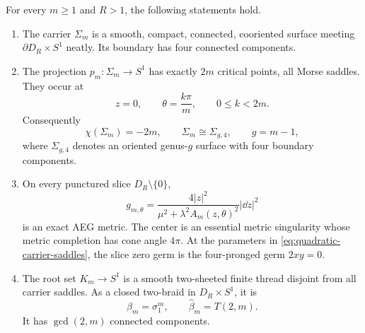 \begin{theorem}
\label{thm:quadratic-threaded-carriers}
For every $m\ge1$ and $R>1$, the following statements hold.
\begin{enumerate}
\item The carrier $\Sigma_m$ is a smooth, compact, connected, cooriented surface
  meeting $\partial D_R\times S^1$ neatly.  Its boundary has four connected
  components.
\item The projection $p_m:\Sigma_m\to S^1$ has exactly $2m$ critical points,
  all Morse saddles.  They occur at
  \begin{equation}
   z=0,
   \qquad
   \theta=\frac{k\pi}{m},
   \qquad 0\le k<2m.
   \label{eq:quadratic-carrier-saddles}
  \end{equation}
  Consequently
  \begin{equation}
   \chi(\Sigma_m)=-2m,
   \qquad
   \Sigma_m\cong\Sigma_{g,4},
   \qquad
   g=m-1,
   \label{eq:quadratic-carrier-genus}
  \end{equation}
  where $\Sigma_{g,4}$ denotes an oriented genus-$g$ surface with four boundary
  components.
\item On every punctured slice $D_R\setminus\{0\}$,
  \begin{equation}
   g_{m,\theta}
   =\frac{4|z|^2}
          {\mu^2+\lambda^2A_m(z,\theta)^2}|\dd z|^2
   \label{eq:quadratic-carrier-singular-aeg}
  \end{equation}
  is an exact AEG metric.  The center is an essential metric singularity whose
  metric completion has cone angle $4\pi$.  At
  the parameters in \eqref{eq:quadratic-carrier-saddles}, the slice zero germ is
  the four-pronged germ $2xy=0$.
\item The root set $K_m\to S^1$ is a smooth two-sheeted finite thread disjoint
  from all carrier saddles.  As a closed two-braid in $D_R\times S^1$, it is
  \begin{equation}
   \beta_m=\sigma_1^m,
   \qquad
   \widehat\beta_m=T(2,m).
   \label{eq:quadratic-carrier-braid}
  \end{equation}
  It has $\gcd(2,m)$ connected components.
\end{enumerate}
\end{theorem}


